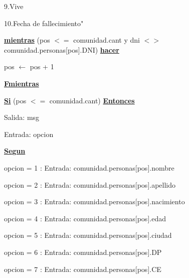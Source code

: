 \documentclass{article}
\begin{document}
                \hspace{25mm}9.Vive

                \hspace{25mm}10.Fecha de fallecimiento"

            \hspace{12mm}\underline{\textbf{mientras}} (pos $<=$ comunidad.cant y dni $<>$ comunidad.personas[pos].DNI) \underline{\textbf{hacer}}

                \hspace{16mm}pos $\leftarrow$ pos + 1

            \hspace{12mm}\underline{\textbf{Fmientras}}

            \hspace{12mm}\underline{\textbf{Si}} (pos $<=$ comunidad.cant) \underline{\textbf{Entonces}}

                \hspace{16mm} Salida: msg

                \hspace{16mm}Entrada: opcion

                \hspace{16mm}\underline{\textbf{Segun}}

                    \hspace{20mm}opcion = 1 : Entrada: comunidad.personas[pos].nombre

                    \hspace{20mm}opcion = 2 : Entrada: comunidad.personas[pos].apellido
                    
                    \hspace{20mm}opcion = 3 : Entrada: comunidad.personas[pos].nacimiento
                    
                    \hspace{20mm}opcion = 4 : Entrada: comunidad.personas[pos].edad
                    
                    \hspace{20mm}opcion = 5 : Entrada: comunidad.personas[pos].ciudad
                    
                    \hspace{20mm}opcion = 6 : Entrada: comunidad.personas[pos].DP
                    
                    \hspace{20mm}opcion = 7 : Entrada: comunidad.personas[pos].CE
                    
\end{document}
